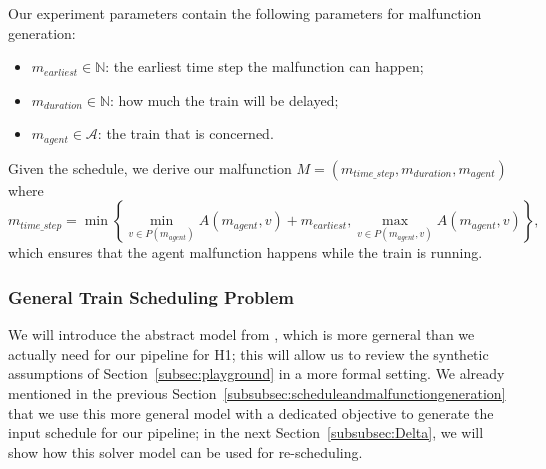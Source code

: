 \documentclass{article}
\begin{document}
Our experiment parameters contain the following parameters for malfunction generation:
\begin{itemize}
    \item $m_{earliest} \in \mathbb{N}$: the earliest time step the malfunction can happen;
    \item $m_{duration} \in \mathbb{N}$: how much the train will be delayed;
    \item $m_{agent} \in \mathcal{A}$: the train that is concerned.
\end{itemize}

Given the schedule, we derive our malfunction $M=(m_{time\_step},m_{duration},m_{agent})$ where
\begin{equation*}
m_{time\_step} = \min \left\{ \min_{v\in P(m_{agent})} A(m_{agent},v) + m_{earliest}, \max_{v \in P(m_{agent},v)} A(m_{agent},v) \right\},
\end{equation*}
which ensures that the agent malfunction happens while the train is running.



\subsubsection{General Train Scheduling Problem}\label{subsubsec:scheduleproblemdescription}

We will introduce the abstract model from \cite{DBLP:journals/corr/abs-2003-08598}, which is more gerneral than we actually need for our pipeline for H1; this will allow us to review the synthetic assumptions of Section~\ref{subsec:playground} in a more formal setting. We already mentioned in the previous Section~\ref{subsubsec:scheduleandmalfunctiongeneration} that we use this more general model with a dedicated objective to generate the input schedule for our pipeline; in the next Section~\ref{subsubsec:Delta}, we will show how this solver model can be used for re-scheduling.
\end{document}
